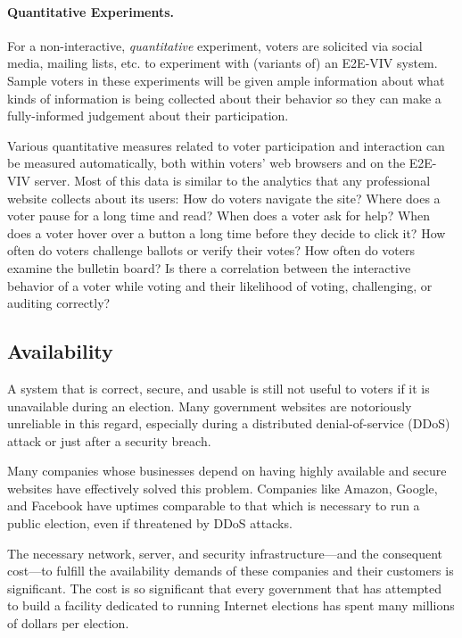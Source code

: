 \paragraph{Quantitative Experiments.}
For a non-interactive, \emph{quantitative} experiment, voters are
solicited via social media, mailing lists, etc. to experiment with
(variants of) an E2E-VIV system. Sample voters in these experiments
will be given ample information about what kinds of information is
being collected about their behavior so they can make a fully-informed
judgement about their participation.

Various quantitative measures related to voter participation and
interaction can be measured automatically, both within voters' web
browsers and on the E2E-VIV server. Most of this data is similar to
the analytics that any professional website collects about its users:
How do voters navigate the site?  Where does a voter pause for a long
time and read?  When does a voter ask for help?  When does a voter
hover over a button a long time before they decide to click it?  How
often do voters challenge ballots or verify their votes?  How often do
voters examine the bulletin board?  Is there a correlation between the
interactive behavior of a voter while voting and their likelihood of
voting, challenging, or auditing correctly?

\subsection{Availability}

A system that is correct, secure, and usable is still not useful to
voters if it is unavailable during an election. Many government
websites are notoriously unreliable in this regard, especially
during a distributed denial-of-service (DDoS) attack or just after a
security breach.

Many companies whose businesses depend on having highly available and
secure websites have effectively solved this problem. Companies like
Amazon, Google, and Facebook have uptimes comparable to that which is
necessary to run a public election, even if threatened by DDoS
attacks.

The necessary network, server, and security infrastructure---and the
consequent cost---to fulfill the availability demands of these
companies and their customers is significant. The cost is so
significant that every government that has attempted to build a
facility dedicated to running Internet elections has spent many
millions of dollars per election.

